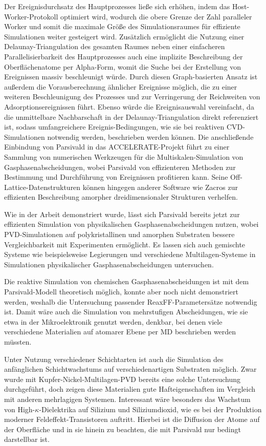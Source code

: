 Der Ereignisdurchsatz des Hauptprozesses ließe sich erhöhen, indem das Host-Worker-Protokoll optimiert wird, wodurch die obere Grenze der Zahl paralleler Worker und somit die maximale Größe des Simulationsraumes für effiziente Simulationen weiter gesteigert wird.
Zusätzlich ermöglicht die Nutzung einer Delaunay-Triangulation des gesamten Raumes neben einer einfacheren Parallelisierbarkeit des Hauptprozesses auch eine implizite Beschreibung der Oberflächenatome per Alpha-Form, womit die Suche bei der Erstellung von Ereignissen massiv beschleunigt würde.
Durch diesen Graph-basierten Ansatz ist außerdem die Vorausberechnung ähnlicher Ereignisse möglich, die zu einer weiteren Beschleunigung des Prozesses und zur Verringerung der Reichweiten von Adsorptionsereignissen führt.
Ebenso würde die Ereignisauswahl vereinfacht, da die unmittelbare Nachbarschaft in der Delaunay-Triangulation direkt referenziert ist, sodass umfangreichere Ereignis-Bedingungen, wie sie bei reaktiven CVD-Simulationen notwendig werden, beschrieben werden können.
Die anschließende Einbindung von Parsivald in das ACCELERATE-Projekt führt zu einer Sammlung von numerischen Werkzeugen für die Multiskalen-Simulation von Gasphasenabscheidungen, wobei Parsivald von effizienteren Methoden zur Bestimmung und Durchführung von Ereignissen profitieren kann.
Seine Off-Lattice-Datenstrukturen können hingegen anderer Software wie Zacros\cite{stamatakis_zacros_2014} zur effizienten Beschreibung amorpher dreidimensionaler Strukturen verhelfen.

Wie in der Arbeit demonstriert wurde, lässt sich Parsivald bereits jetzt zur effizienten Simulation von physikalischen Gasphasenabscheidungen nutzen, wobei PVD-Simulationen auf polykristallinen und amorphen Substraten bessere Vergleichbarkeit mit Experimenten ermöglicht\cite{adamov_electrical_1974}.
Es lassen sich auch gemischte Systeme wie beispielsweise Legierungen und verschiedene Multilagen-Systeme in Simulationen physikalischer Gasphasenabscheidungen untersuchen.

Die reaktive Simulation von chemischen Gasphasenabscheidungen ist mit dem Parsivald-Modell theoretisch möglich, konnte aber noch nicht demonstriert werden, weshalb die Untersuchung passender ReaxFF-Parametersätze notwendig ist.
Damit wäre auch die Simulation von mehrstufigen Abscheidungen, wie sie etwa in der Mikroelektronik genutzt werden\cite{granneman_thin_1993}, denkbar, bei denen viele verschiedene Materialien auf atomarer Ebene per MD beschrieben werden müssten.

Unter Nutzung verschiedener Schichtarten ist auch die Simulation des anfänglichen Schichtwachstums auf verschiedenartigen Substraten möglich.
Zwar wurde mit Kupfer-Nickel-Multi\-lagen-PVD bereits eine solche Untersuchung durchgeführt, doch zeigen diese Materialien gute Hafteigenschaften im Vergleich mit anderen mehrlagigen Systemen.
Interessant wäre besonders das Wachstum von High-$\kappa$-Dielektrika auf Silizium und Siliziumdioxid, wie es bei der Produktion moderner Feldeffekt-Transistoren auftritt.
Hierbei ist die Diffusion der Atome auf der Oberfläche und in sie hinein zu beachten, die mit Parsivald nur bedingt darstellbar ist.

